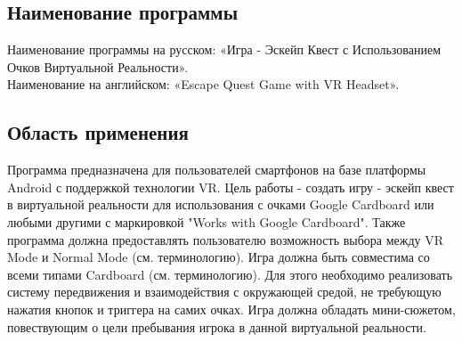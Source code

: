 \subsection{Наименование программы}
\tab[0.75cm]Наименование программы на русском: «Игра - Эскейп Квест с Использованием Очков Виртуальной Реальности». \\
Наименование на английском: «Escape Quest Game with VR Headset». \\


\subsection{Область применения}
\tab[0.75cm]
Программа предназначена для пользователей смартфонов на базе платформы Android с поддержкой технологии VR. Цель работы - создать игру - эскейп квест в виртуальной реальности для использования с очками Google Cardboard или любыми другими с маркировкой "Works with Google Cardboard".
Также программа должна предоставлять пользователю возможность выбора между VR Mode и Normal Mode (см. терминологию). Игра должна быть совместима со всеми типами Cardboard (см. терминологию). Для этого необходимо реализовать систему передвижения и взаимодействия с окружающей средой, не требующую нажатия кнопок и триггера на самих очках. Игра должна обладать мини-сюжетом, повествующим о цели пребывания игрока в данной виртуальной реальности.